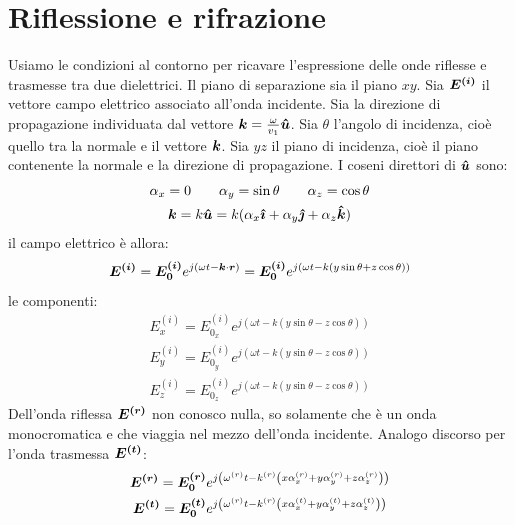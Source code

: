 \section{Riflessione e rifrazione}
Usiamo le condizioni al contorno per ricavare l'espressione delle onde riflesse e trasmesse tra due dielettrici. Il piano di separazione sia il piano $xy$. Sia $\boldsymbol{E^{(i)}}$ il vettore campo elettrico associato all'onda incidente. Sia la direzione di propagazione individuata dal vettore $\boldsymbol{k}=\frac{\omega}{v_1}\boldsymbol{\hat {u}}$. Sia $\theta$ l'angolo di incidenza, cioè quello tra la normale e il vettore $\boldsymbol{k}$. Sia $yz$ il piano di incidenza, cioè il piano contenente la normale e la direzione di propagazione. I coseni direttori di $\boldsymbol{\hat {u}}$ sono:
\begin{subequations}
\begin{gather}
\alpha_x = 0\qquad \alpha_y = \sin\theta\qquad \alpha_z = \cos \theta\\
\boldsymbol{k} = k\boldsymbol{\hat {u}}=k(\alpha_x\boldsymbol{\hat {\imath}}+\alpha_y\boldsymbol{\hat {\jmath}}+\alpha_z\boldsymbol{\hat {k}})
\end{gather}
\end{subequations}
il campo elettrico è allora:
\begin{equation}
\boldsymbol{E^{(i)}}=\boldsymbol{E^{(i)}_0}e^{j\left(\omega t-\boldsymbol{k}\cdot\boldsymbol{r}\right)}=\boldsymbol{E^{(i)}_0}e^{j\left(\omega t-k\left(y\sin\theta+z\cos\theta\right)\right)}
\end{equation}
le componenti:
\begin{subequations}
\begin{gather}
E^{(i)}_x=E^{(i)}_{0_x}e^{j\left(\omega t-k\left(y\sin\theta-z\cos\theta\right)\right)}\\
E^{(i)}_y=E^{(i)}_{0_y}e^{j\left(\omega t-k\left(y\sin\theta-z\cos\theta\right)\right)}\\
E^{(i)}_z=E^{(i)}_{0_z}e^{j\left(\omega t-k\left(y\sin\theta-z\cos\theta\right)\right)}
\end{gather}
\end{subequations}
Dell'onda riflessa $\boldsymbol{E^{(r)}}$ non conosco nulla, so solamente che è un onda monocromatica e che viaggia nel mezzo dell'onda incidente. Analogo discorso per l'onda trasmessa $\boldsymbol{E^{(t)}}$:
\begin{subequations}
\begin{gather}
\boldsymbol{E^{(r)}}=\boldsymbol{E^{(r)}_0}e^{j\left(\omega^{(r)} t-k^{(r)}\left(x\alpha^{(r)}_x+y\alpha^{(r)}_y+z\alpha^{(r)}_z\right)\right)}\\
\boldsymbol{E^{(t)}}=\boldsymbol{E^{(t)}_0}e^{j\left(\omega^{(r)} t-k^{(r)}\left(x\alpha^{(t)}_x+y\alpha^{(t)}_y+z\alpha^{(t)}_z\right)\right)}
\end{gather}
\end{subequations}

